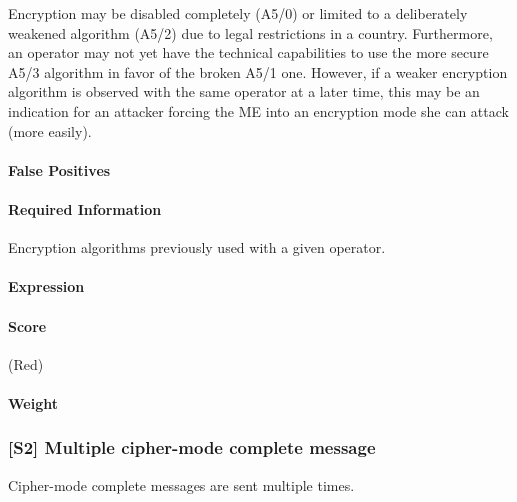 \documentclass[a4paper,11pt,notitlepage,bigheadings,oneside]{scrartcl}
\begin{document}
Encryption may be disabled completely (A5/0) or limited to a deliberately
weakened algorithm (A5/2) due to legal restrictions in a country. Furthermore,
an operator may not yet have the technical capabilities to use the more secure
A5/3 algorithm in favor of the broken A5/1 one. However, if a weaker encryption
algorithm is observed with the same operator at a later time, this may be an
indication for an attacker forcing the ME into an encryption mode she can
attack (more easily).

\paragraph{False Positives}

\TBD


\paragraph{Required Information}

Encryption algorithms previously used with a given operator.


\paragraph{Expression}

\TBD

\paragraph{Score}

\TBD{} (Red)

\paragraph{Weight}

\TBD{}

\subsubsection{[S2] Multiple cipher-mode complete message}

Cipher-mode complete messages are sent multiple times.
\end{document}
